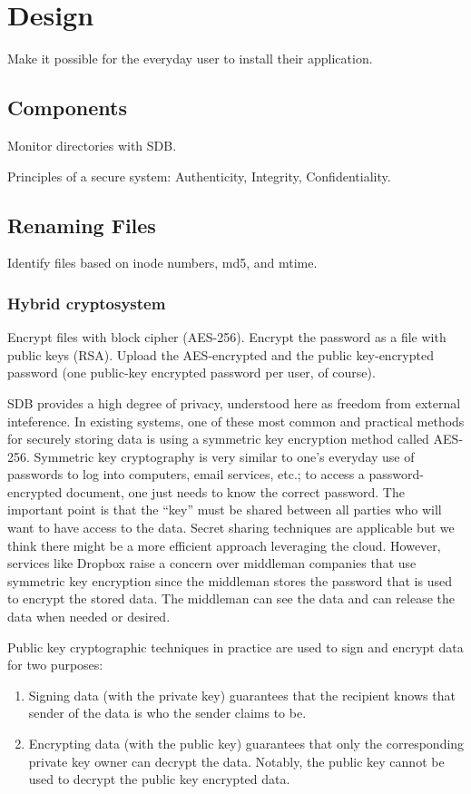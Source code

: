 \section{Design}

Make it possible for the everyday user to install their application.

\subsection{Components}

Monitor directories with SDB.

Principles of a secure system: Authenticity, Integrity,
Confidentiality.

\subsection{Renaming Files}

Identify files based on inode numbers, md5, and mtime.

\subsubsection*{Hybrid cryptosystem}
Encrypt files with block cipher (AES-256). Encrypt the password as a
file with public keys (RSA).  Upload the AES-encrypted and the public
key-encrypted password (one public-key encrypted password per user, of
course).

SDB provides a high degree of privacy, understood here as freedom from
external inteference. In existing systems, one of these most common
and practical methods for securely storing data is using a symmetric
key encryption method called AES-256. Symmetric key cryptography is
very similar to one's everyday use of passwords to log into computers,
email services, etc.; to access a password-encrypted document, one
just needs to know the correct password. The important point is that
the ``key'' must be shared between all parties who will want to have
access to the data. Secret sharing techniques are applicable but we
think there might be a more efficient approach leveraging the
cloud. However, services like Dropbox raise a concern over middleman
companies that use symmetric key encryption since the middleman stores
the password that is used to encrypt the stored data. The middleman
can see the data and can release the data when needed or desired.

Public key cryptographic techniques in practice are used to sign and
encrypt data for two purposes: 
\begin{enumerate}
\item Signing data (with the private key) guarantees that the
  recipient knows that sender of the data is who the sender claims to
  be.
\item Encrypting data (with the public key) guarantees that only the
  corresponding private key owner can decrypt the data. Notably, the
  public key cannot be used to decrypt the public key encrypted data.
\end{enumerate}

